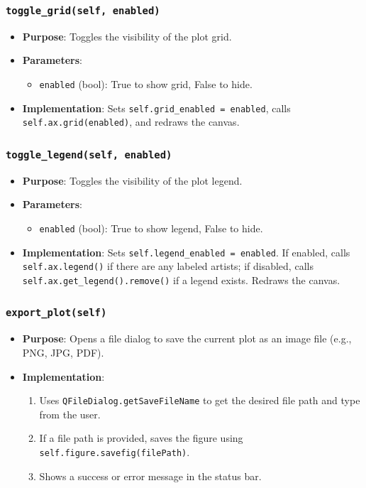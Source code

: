 \documentclass[12pt,a4paper]{report}
\begin{document}
\subsubsection{\texttt{toggle\_grid(self, enabled)}}
\begin{itemize}
    \item \textbf{Purpose}: Toggles the visibility of the plot grid.
    \item \textbf{Parameters}:
        \begin{itemize}
            \item \texttt{enabled} (bool): True to show grid, False to hide.
        \end{itemize}
    \item \textbf{Implementation}: Sets \texttt{self.grid\_enabled = enabled}, calls \texttt{self.ax.grid(enabled)}, and redraws the canvas.
\end{itemize}

\subsubsection{\texttt{toggle\_legend(self, enabled)}}
\begin{itemize}
    \item \textbf{Purpose}: Toggles the visibility of the plot legend.
    \item \textbf{Parameters}:
        \begin{itemize}
            \item \texttt{enabled} (bool): True to show legend, False to hide.
        \end{itemize}
    \item \textbf{Implementation}: Sets \texttt{self.legend\_enabled = enabled}. If enabled, calls \texttt{self.ax.legend()} if there are any labeled artists; if disabled, calls \texttt{self.ax.get\_legend().remove()} if a legend exists. Redraws the canvas.
\end{itemize}

\subsubsection{\texttt{export\_plot(self)}}
\begin{itemize}
    \item \textbf{Purpose}: Opens a file dialog to save the current plot as an image file (e.g., PNG, JPG, PDF).
    \item \textbf{Implementation}:
        \begin{enumerate}
            \item Uses \texttt{QFileDialog.getSaveFileName} to get the desired file path and type from the user.
            \item If a file path is provided, saves the figure using \texttt{self.figure.savefig(filePath)}.
            \item Shows a success or error message in the status bar.
        \end{enumerate}
\end{itemize}
\end{document}

